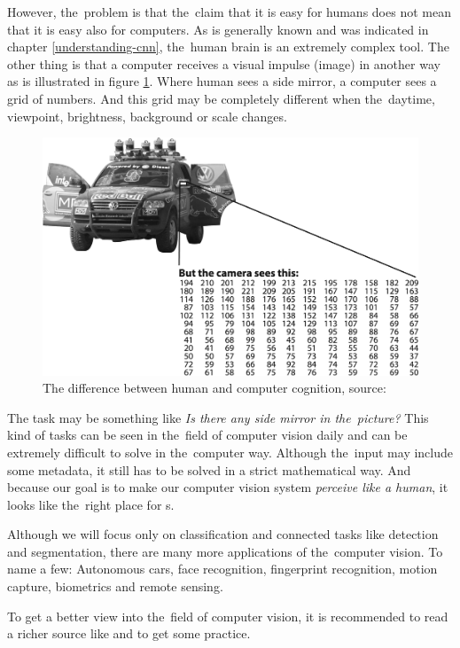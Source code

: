 However, the~problem is that the~claim that it is easy for humans does not mean 
that it is easy also for computers. As is generally known and was indicated in 
chapter \ref{understanding-cnn}, the~human brain is an extremely complex tool. 
The other thing is that a computer receives a visual impulse (image) in another 
way as is illustrated in figure \ref{fig:mirror}. Where human sees a side 
mirror, a computer sees a grid of numbers. And this grid may be completely 
different when the~daytime, viewpoint, brightness, background or scale changes.

\begin{figure}[H]
   \centering
	\includegraphics[width=.8\linewidth]{./pictures/comp-vision.png}
	\caption[Human and computer cognition]{The difference between human and 
computer cognition, source: \cite{opencv}}
      \label{fig:mirror}
\end{figure}

The task may be something like \textit{Is there any side mirror in the~picture?} 
This kind of tasks can be seen in the~field of computer vision daily and can be 
extremely difficult to solve in the~computer way. Although the~input may include 
some metadata, it still has to be solved in a strict mathematical way. And 
because our goal is to make our computer vision system \textit{perceive like a 
human}, it looks like the~right place for s.

Although we will focus only on classification and connected tasks like detection 
and segmentation, there are many more applications of the~computer vision. To 
name a few: Autonomous cars, face recognition, fingerprint recognition, motion 
capture, biometrics and remote sensing.

To get a better view into the~field of computer vision, it is recommended to 
read a richer source like \cite{comp-vision} and \cite{opencv} to get some 
practice.

